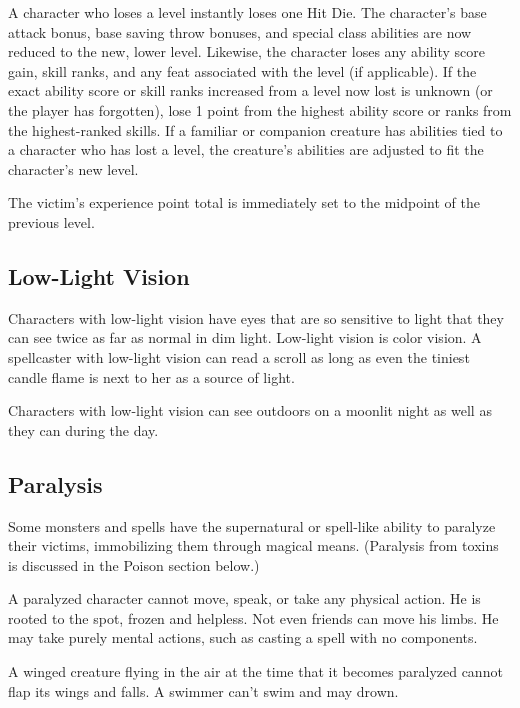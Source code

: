 A character who loses a level instantly loses one Hit Die. The character's base 
attack bonus, base saving throw bonuses, and special class abilities are now reduced 
to the new, lower level. Likewise, the character loses any ability score gain, 
skill ranks, and any feat associated with the level (if applicable). If the exact 
ability score or skill ranks increased from a level now lost is unknown (or the 
player has forgotten), lose 1 point from the highest ability score or ranks from 
the highest-ranked skills. If a familiar or companion creature has abilities tied 
to a character who has lost a level, the creature's abilities are adjusted to fit 
the character's new level.

The victim's experience point total is immediately set to the midpoint of the previous 
level.

\subsection{Low-Light Vision}

Characters with low-light vision have eyes that are so sensitive to light that 
they can see twice as far as normal in dim light. Low-light vision is color vision. 
A spellcaster with low-light vision can read a scroll as long as even the tiniest 
candle flame is next to her as a source of light.

Characters with low-light vision can see outdoors on a moonlit night as well as 
they can during the day.

\subsection{Paralysis}

Some monsters and spells have the supernatural or spell-like ability to paralyze 
their victims, immobilizing them through magical means. (Paralysis from toxins 
is discussed in the Poison section below.)

A paralyzed character cannot move, speak, or take any physical action. He is rooted 
to the spot, frozen and helpless. Not even friends can move his limbs. He may take 
purely mental actions, such as casting a spell with no components.

A winged creature flying in the air at the time that it becomes paralyzed cannot 
flap its wings and falls. A swimmer can't swim and may drown.

